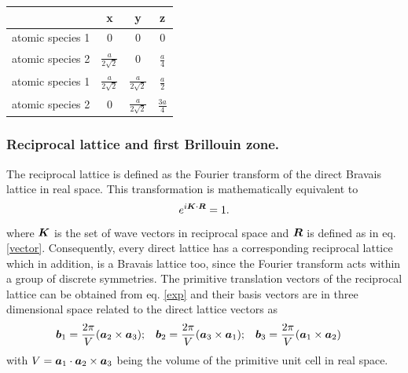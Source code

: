 	\begin{center}
		\begin{tabular}{c c c c} 
			\hline
			& \textbf{x} & \textbf{y} & \textbf{z}\\ 
			\hline 
			\vspace{0.2cm} 
			atomic species 1 & 0 & 0 & 0 \\
			\vspace{0.2cm}
			atomic species 2 & $\frac{a}{2\sqrt{2}}$ & 0 & $\frac{a}{4}$ \\
			\vspace{0.2cm}
			atomic species 1 & $\frac{a}{2\sqrt{2}}$ & $\frac{a}{2\sqrt{2}}$ & $\frac{a}{2}$ \\
			\vspace{0.2cm}
			atomic species 2 & 0 & $\frac{a}{2\sqrt{2}}$ & $\frac{3a}{4}$
		\end{tabular}
	\end{center}	
	\FloatBarrier
	\subsubsection{Reciprocal lattice and first Brillouin zone.} \label{Brillouin_zone}
		The reciprocal lattice is defined as the Fourier transform of the direct Bravais lattice in real space. This transformation is mathematically equivalent to
		\begin{equation} \label{exp}
		e^{i \boldsymbol{K} \cdot \boldsymbol{R}} = 1.
		\end{equation}
		where $\boldsymbol{K}$ is the set of wave vectors in reciprocal space and $\boldsymbol{R}$ is defined as in eq. \ref{vector}.
		Consequently, every direct lattice has a corresponding reciprocal lattice which in addition, is a Bravais lattice too, since the Fourier transform acts within a group of discrete symmetries.		
		The primitive translation vectors of the reciprocal lattice can be obtained from eq. \eqref{exp} and their basis vectors are in three dimensional space related to the direct lattice vectors as
		\begin{align}
			\boldsymbol{b}_1 &= \frac{2\pi}{V}(\boldsymbol{a}_2 \times \boldsymbol{a}_3); &
			\boldsymbol{b}_2 &= \frac{2\pi}{V}(\boldsymbol{a}_3 \times \boldsymbol{a}_1); &
			\boldsymbol{b}_3 &= \frac{2\pi}{V}(\boldsymbol{a}_1 \times \boldsymbol{a}_2)
		\end{align} 
		with $V=\boldsymbol{a}_1 \cdot \boldsymbol{a}_2 \times \boldsymbol{a}_3$ being the volume of the primitive unit cell in real space.
		 
